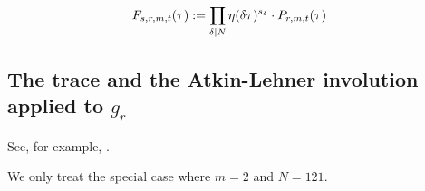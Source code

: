\documentclass{article}
\begin{document}
\begin{align*}
  F_{s, r, m, t}(\tau)
  &:=
    \prod_{\delta \mid N} \eta(\delta \tau)^{s_\delta} \cdot P_{r, m, t}(\tau)
\end{align*}




























 \subsection{The trace and the Atkin-Lehner involution applied to
   $g_r$}

See, for example, \cite{Kohnen_WeierstrassPointsAtInfinity_2004}.

We only treat the special case where $m=2$ and $N=121$.
\end{document}
